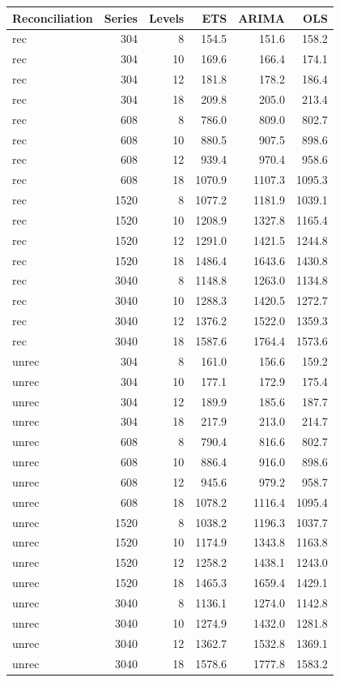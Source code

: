\documentclass[11pt,a4paper,]{article}
\let\origtable\table
\let\endorigtable\endtable
\renewenvironment{table}[1][2] {
    \expandafter\origtable\expandafter[!htbp]
} {
    \endorigtable
}
\begin{document}
\begin{table}[!h]

\caption{\label{tab:TourismdatasimfixlevelNS}Mean RMSE by number of hierarchy levels, number of bottom-level series, method, with/without reconciliation. Simulated series has error value 0.5. Forecasting uses fixed origin for a 24-month horizon.}
\centering
\begin{tabular}[t]{lrrrrr}
\toprule
Reconciliation & Series & Levels & ETS & ARIMA & OLS\\
\midrule
rec & 304 & 8 & 154.5 & 151.6 & 158.2\\
rec & 304 & 10 & 169.6 & 166.4 & 174.1\\
rec & 304 & 12 & 181.8 & 178.2 & 186.4\\
rec & 304 & 18 & 209.8 & 205.0 & 213.4\\
rec & 608 & 8 & 786.0 & 809.0 & 802.7\\
rec & 608 & 10 & 880.5 & 907.5 & 898.6\\
rec & 608 & 12 & 939.4 & 970.4 & 958.6\\
rec & 608 & 18 & 1070.9 & 1107.3 & 1095.3\\
rec & 1520 & 8 & 1077.2 & 1181.9 & 1039.1\\
rec & 1520 & 10 & 1208.9 & 1327.8 & 1165.4\\
rec & 1520 & 12 & 1291.0 & 1421.5 & 1244.8\\
rec & 1520 & 18 & 1486.4 & 1643.6 & 1430.8\\
rec & 3040 & 8 & 1148.8 & 1263.0 & 1134.8\\
rec & 3040 & 10 & 1288.3 & 1420.5 & 1272.7\\
rec & 3040 & 12 & 1376.2 & 1522.0 & 1359.3\\
rec & 3040 & 18 & 1587.6 & 1764.4 & 1573.6\\
unrec & 304 & 8 & 161.0 & 156.6 & 159.2\\
unrec & 304 & 10 & 177.1 & 172.9 & 175.4\\
unrec & 304 & 12 & 189.9 & 185.6 & 187.7\\
unrec & 304 & 18 & 217.9 & 213.0 & 214.7\\
unrec & 608 & 8 & 790.4 & 816.6 & 802.7\\
unrec & 608 & 10 & 886.4 & 916.0 & 898.6\\
unrec & 608 & 12 & 945.6 & 979.2 & 958.7\\
unrec & 608 & 18 & 1078.2 & 1116.4 & 1095.4\\
unrec & 1520 & 8 & 1038.2 & 1196.3 & 1037.7\\
unrec & 1520 & 10 & 1174.9 & 1343.8 & 1163.8\\
unrec & 1520 & 12 & 1258.2 & 1438.1 & 1243.0\\
unrec & 1520 & 18 & 1465.3 & 1659.4 & 1429.1\\
unrec & 3040 & 8 & 1136.1 & 1274.0 & 1142.8\\
unrec & 3040 & 10 & 1274.9 & 1432.0 & 1281.8\\
unrec & 3040 & 12 & 1362.7 & 1532.8 & 1369.1\\
unrec & 3040 & 18 & 1578.6 & 1777.8 & 1583.2\\
\bottomrule
\end{tabular}
\end{table}
\end{document}
